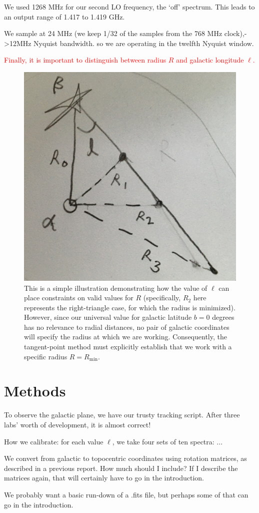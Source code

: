 \documentclass[12pt]{article}
\begin{document}
We used 1268 MHz for our second LO frequency, the `off' spectrum. This leads to an output range of 1.417 to 1.419 GHz.

We sample at 24 MHz (we keep 1/32 of the samples from the 768 MHz clock),->12MHz Nyquist bandwidth. so we are operating in the twelfth Nyquist window.

\textcolor{red}{Finally, it is important to distinguish between radius $R$ and galactic longitude $\ell$.}

\begin{figure}
	\centering
	\includegraphics[width=.4\linewidth]{ell_versus_r}
	\caption{This is a simple illustration demonstrating how the value of $\ell$ can place constraints on valid values for $R$ (specifically, $R_2$ here represents the right-triangle case, for which the radius is minimized). However, since our universal value for galactic latitude $b = 0$ degrees has no relevance to radial distances, no pair of galactic coordinates will specify the radius at which we are working. Consequently, the tangent-point method must explicitly establish that we work with a specific radius $R = R_\text{min}$.}
	\label{fig:ell_vs_r}
\end{figure}

\section{Methods}

\quad \quad To observe the galactic plane, we have our trusty tracking script. After three labs' worth of development, it is almost correct!

How we calibrate: for each value $\ell$, we take four sets of ten spectra: ...

We convert from galactic to topocentric coordinates using rotation matrices, as described in a previous report. How much should I include? If I describe the matrices again, that will certainly have to go in the introduction.

We probably want a basic run-down of a .fits file, but perhaps some of that can go in the introduction.
\end{document}
